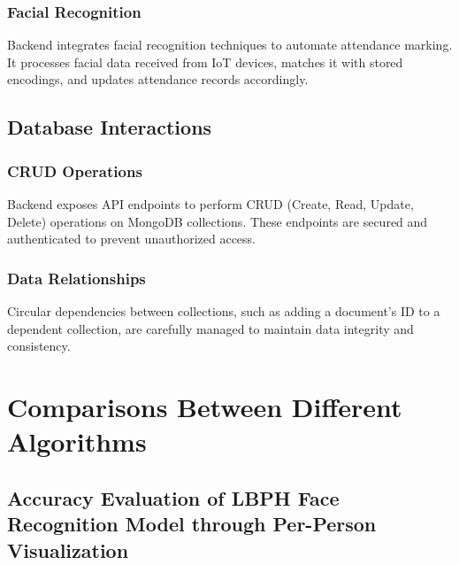 \documentclass[conference]{IEEEtran}
\begin{document}
\subsubsection{Facial Recognition}
Backend integrates facial recognition techniques to automate attendance marking. It processes facial data received from IoT devices, matches it with stored encodings, and updates attendance records accordingly.

\subsection{Database Interactions}
\subsubsection{CRUD Operations}
Backend exposes API endpoints to perform CRUD (Create, Read, Update, Delete) operations on MongoDB collections. These endpoints are secured and authenticated to prevent unauthorized access.

\subsubsection{Data Relationships}
Circular dependencies between collections, such as adding a document's ID to a dependent collection, are carefully managed to maintain data integrity and consistency.
\section{Comparisons Between Different Algorithms}
\subsection{Accuracy Evaluation of LBPH Face Recognition Model through Per-Person Visualization}
\end{document}
